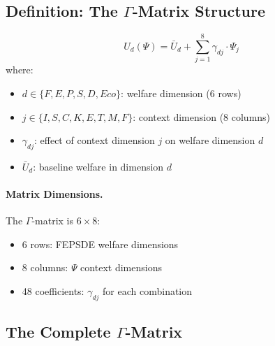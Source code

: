 \subsection{Definition: The $\Gamma$-Matrix Structure}

\begin{tcolorbox}[colback=blue!5!white, colframe=blue!50!black, title=Definition: $\Gamma$-Matrix]
\begin{equation}
\boxed{
U_d(\Psi) = \bar{U}_d + \sum_{j=1}^{8} \gamma_{dj} \cdot \Psi_j
}
\label{eq:app-c-gamma-definition}
\end{equation}
where:
\begin{itemize}
\item $d \in \{F, E, P, S, D, Eco\}$: welfare dimension (6 rows)
\item $j \in \{I, S, C, K, E, T, M, F\}$: context dimension (8 columns)
\item $\gamma_{dj}$: effect of context dimension $j$ on welfare dimension $d$
\item $\bar{U}_d$: baseline welfare in dimension $d$
\end{itemize}
\end{tcolorbox}

\paragraph{Matrix Dimensions.}
The $\Gamma$-matrix is $6 \times 8$:
\begin{itemize}
\item 6 rows: FEPSDE welfare dimensions
\item 8 columns: $\Psi$ context dimensions
\item 48 coefficients: $\gamma_{dj}$ for each combination
\end{itemize}

\subsection{The Complete $\Gamma$-Matrix}


